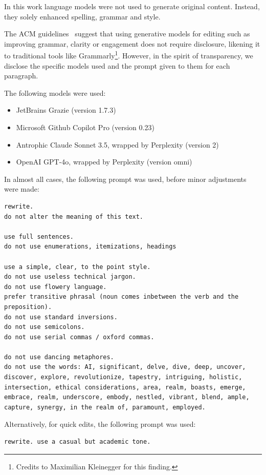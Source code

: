 \documentclass[a4paper, oneside]{discothesis}
\begin{document}
In this work language models were not used to generate original content. Instead, they solely enhanced spelling, grammar and style.

The ACM guidelines~\cite{acm_authorship_2024} suggest that using generative models for editing \textendash{} such as improving grammar, clarity or engagement \textendash{} does not require disclosure, likening it to traditional tools like Grammarly\footnote{Credits to Maximilian Kleinegger for this finding.}. However, in the spirit of transparency, we disclose the specific models used and the prompt given to them for each paragraph.

The following models were used:

\begin{itemize}
	\item JetBrains Grazie (version 1.7.3)
	\item Microsoft Github Copilot Pro (version 0.23)
	\item Antrophic Claude Sonnet 3.5, wrapped by Perplexity (version 2)
	\item OpenAI GPT-4o, wrapped by Perplexity (version omni)
\end{itemize}

In almost all cases, the following prompt was used, before minor adjustments were made:

\begin{verbatim}
rewrite.
do not alter the meaning of this text.

use full sentences.
do not use enumerations, itemizations, headings

use a simple, clear, to the point style.
do not use useless technical jargon.
do not use flowery language.
prefer transitive phrasal (noun comes inbetween the verb and the preposition).
do not use standard inversions.
do not use semicolons.
do not use serial commas / oxford commas.

do not use dancing metaphores.
do not use the words: AI, significant, delve, dive, deep, uncover, discover, explore, revolutionize, tapestry, intriguing, holistic, intersection, ethical considerations, area, realm, boasts, emerge, embrace, realm, underscore, embody, nestled, vibrant, blend, ample, capture, synergy, in the realm of, paramount, employed.
\end{verbatim}

Alternatively, for quick edits, the following prompt was used:

\begin{verbatim}
rewrite. use a casual but academic tone.
\end{verbatim}
\end{document}
